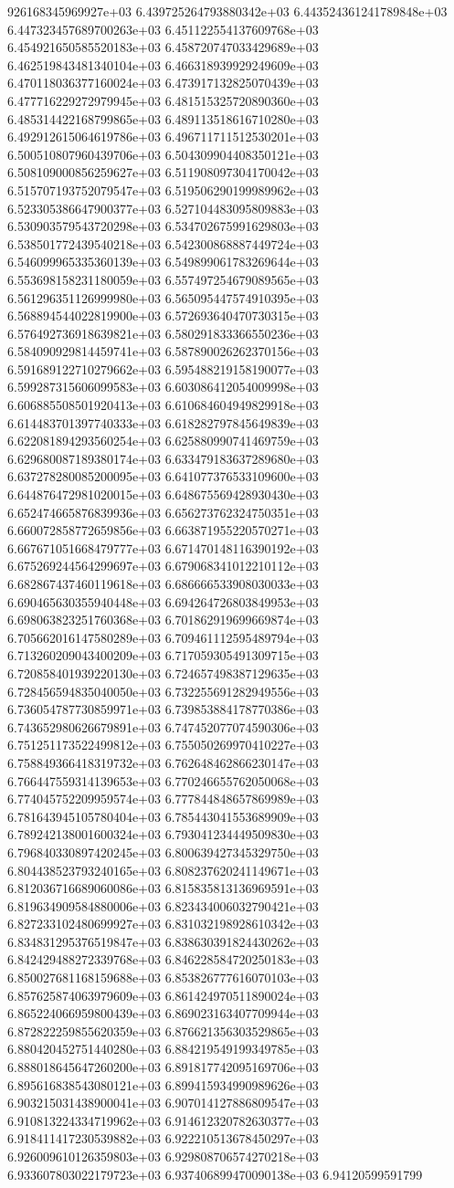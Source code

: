 926168345969927e+03	6.439725264793880342e+03	6.443524361241789848e+03	6.447323457689700263e+03	6.451122554137609768e+03	6.454921650585520183e+03	6.458720747033429689e+03	6.462519843481340104e+03	6.466318939929249609e+03	6.470118036377160024e+03	6.473917132825070439e+03	6.477716229272979945e+03	6.481515325720890360e+03	6.485314422168799865e+03	6.489113518616710280e+03	6.492912615064619786e+03	6.496711711512530201e+03	6.500510807960439706e+03	6.504309904408350121e+03	6.508109000856259627e+03	6.511908097304170042e+03	6.515707193752079547e+03	6.519506290199989962e+03	6.523305386647900377e+03	6.527104483095809883e+03	6.530903579543720298e+03	6.534702675991629803e+03	6.538501772439540218e+03	6.542300868887449724e+03	6.546099965335360139e+03	6.549899061783269644e+03	6.553698158231180059e+03	6.557497254679089565e+03	6.561296351126999980e+03	6.565095447574910395e+03	6.568894544022819900e+03	6.572693640470730315e+03	6.576492736918639821e+03	6.580291833366550236e+03	6.584090929814459741e+03	6.587890026262370156e+03	6.591689122710279662e+03	6.595488219158190077e+03	6.599287315606099583e+03	6.603086412054009998e+03	6.606885508501920413e+03	6.610684604949829918e+03	6.614483701397740333e+03	6.618282797845649839e+03	6.622081894293560254e+03	6.625880990741469759e+03	6.629680087189380174e+03	6.633479183637289680e+03	6.637278280085200095e+03	6.641077376533109600e+03	6.644876472981020015e+03	6.648675569428930430e+03	6.652474665876839936e+03	6.656273762324750351e+03	6.660072858772659856e+03	6.663871955220570271e+03	6.667671051668479777e+03	6.671470148116390192e+03	6.675269244564299697e+03	6.679068341012210112e+03	6.682867437460119618e+03	6.686666533908030033e+03	6.690465630355940448e+03	6.694264726803849953e+03	6.698063823251760368e+03	6.701862919699669874e+03	6.705662016147580289e+03	6.709461112595489794e+03	6.713260209043400209e+03	6.717059305491309715e+03	6.720858401939220130e+03	6.724657498387129635e+03	6.728456594835040050e+03	6.732255691282949556e+03	6.736054787730859971e+03	6.739853884178770386e+03	6.743652980626679891e+03	6.747452077074590306e+03	6.751251173522499812e+03	6.755050269970410227e+03	6.758849366418319732e+03	6.762648462866230147e+03	6.766447559314139653e+03	6.770246655762050068e+03	6.774045752209959574e+03	6.777844848657869989e+03	6.781643945105780404e+03	6.785443041553689909e+03	6.789242138001600324e+03	6.793041234449509830e+03	6.796840330897420245e+03	6.800639427345329750e+03	6.804438523793240165e+03	6.808237620241149671e+03	6.812036716689060086e+03	6.815835813136969591e+03	6.819634909584880006e+03	6.823434006032790421e+03	6.827233102480699927e+03	6.831032198928610342e+03	6.834831295376519847e+03	6.838630391824430262e+03	6.842429488272339768e+03	6.846228584720250183e+03	6.850027681168159688e+03	6.853826777616070103e+03	6.857625874063979609e+03	6.861424970511890024e+03	6.865224066959800439e+03	6.869023163407709944e+03	6.872822259855620359e+03	6.876621356303529865e+03	6.880420452751440280e+03	6.884219549199349785e+03	6.888018645647260200e+03	6.891817742095169706e+03	6.895616838543080121e+03	6.899415934990989626e+03	6.903215031438900041e+03	6.907014127886809547e+03	6.910813224334719962e+03	6.914612320782630377e+03	6.918411417230539882e+03	6.922210513678450297e+03	6.926009610126359803e+03	6.929808706574270218e+03	6.933607803022179723e+03	6.937406899470090138e+03	6.94120599591799